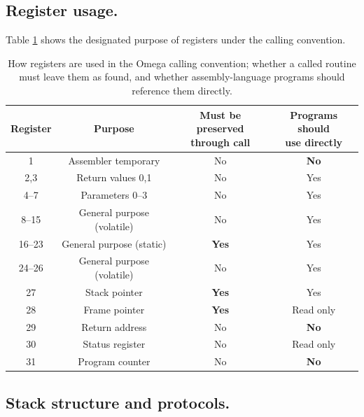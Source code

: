 \documentclass[12pt,english,twoside]{report}
\begin{document}
\subsection{\label{sec:RegisterUsage} Register usage.}

Table \ref{tab:CallingConventionRegisters} shows the designated
purpose of registers under the calling convention.

\begin{table}[h]
  \begin{center}
  \begin{tabular}{c|c|c|c}
    \textbf{Register} & \textbf{Purpose} & \makecell{\textbf{Must be preserved}\\ \textbf{through call}} & \makecell{\textbf{Programs should}\\ \textbf{use directly}}\\
    \hline
    1 & Assembler temporary & No & \textbf{No} \\
    \hline
    2,3 & Return values 0,1 & No & Yes \\
    \hline
    4--7 & Parameters 0--3 & No & Yes \\
    \hline
    8--15 & General purpose (volatile) & No & Yes \\
    \hline
    16--23 & General purpose (static) & \textbf{Yes} & Yes \\
    \hline
    24--26 & General purpose (volatile) & No & Yes \\
    \hline
    27 & \index{Stack pointer} Stack pointer & \textbf{Yes} & Yes \\
    \hline
    28 & \index{Frame pointer} Frame pointer & \textbf{Yes} & Read only \\
    \hline
    29 & \index{Return address register} Return address & No & \textbf{No} \\
    \hline
    30 & Status register & No & Read only \\
    \hline
    31 & Program counter & No & \textbf{No}
  \end{tabular}
  \end{center}
  \caption{\label{tab:CallingConventionRegisters} How registers are used in the Omega calling convention; whether a called routine must leave them as found, and whether assembly-language programs should reference them directly.}
\end{table}

\subsection{Stack structure and protocols.}
\end{document}
